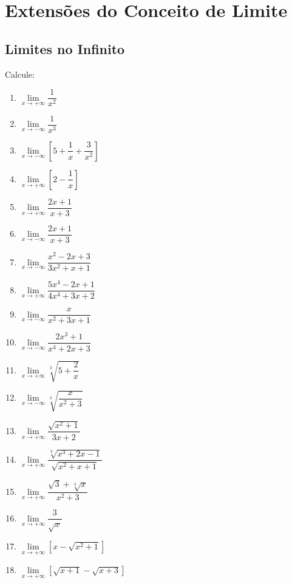 \setcounter{section}{3}
\setcounter{subsection}{0}

\section{Extensões do Conceito de Limite}

\subsection{Limites no Infinito}

\begin{exercicio}[1]
Calcule:
\begin{enumerate}[label=\alph*)]
    \item $\lim\limits_{x \to +\infty} \dfrac{1}{x^2}$
    \item $\lim\limits_{x \to -\infty} \dfrac{1}{x^3}$
    \item $\lim\limits_{x \to -\infty} \left[5 + \dfrac{1}{x} + \dfrac{3}{x^2}\right]$
    \item $\lim\limits_{x \to +\infty} \left[2 - \dfrac{1}{x}\right]$
    \item $\lim\limits_{x \to +\infty} \dfrac{2x + 1}{x + 3}$
    \item $\lim\limits_{x \to -\infty} \dfrac{2x + 1}{x + 3}$
    \item $\lim\limits_{x \to -\infty} \dfrac{x^2 - 2x + 3}{3x^2 + x + 1}$
    \item $\lim\limits_{x \to +\infty} \dfrac{5x^4 - 2x + 1}{4x^4 + 3x + 2}$
    \item $\lim\limits_{x \to -\infty} \dfrac{x}{x^2 + 3x + 1}$
    \item $\lim\limits_{x \to -\infty} \dfrac{2x^3 + 1}{x^4 + 2x + 3}$
    \item $\lim\limits_{x \to +\infty} \sqrt[3]{5 + \dfrac{2}{x}}$
    \item $\lim\limits_{x \to -\infty} \sqrt[3]{\dfrac{x}{x^2 + 3}}$
    \item $\lim\limits_{x \to +\infty} \dfrac{\sqrt{x^2 + 1}}{3x + 2}$
    \item $\lim\limits_{x \to +\infty} \dfrac{\sqrt[3]{x^3 + 2x - 1}}{\sqrt{x^2 + x + 1}}$
    \item $\lim\limits_{x \to +\infty} \dfrac{\sqrt{3} + \sqrt[3]{x}}{x^2 + 3}$
    \item $\lim\limits_{x \to +\infty} \dfrac{3}{\sqrt{x}}$
    \item $\lim\limits_{x \to +\infty} \left[x - \sqrt{x^2 + 1}\right]$
    \item $\lim\limits_{x \to +\infty} \left[\sqrt{x + 1} - \sqrt{x + 3}\right]$
\end{enumerate}
\end{exercicio}

